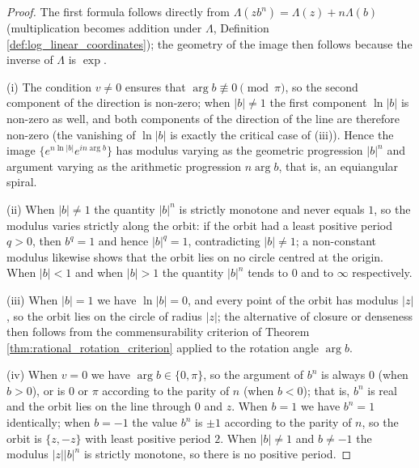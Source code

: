 \begin{proof}
The first formula follows directly from $\Lambda(zb^n)=\Lambda(z)+n\Lambda(b)$ (multiplication becomes addition under $\Lambda$, Definition \ref{def:log_linear_coordinates}); the geometry of the image then follows because the inverse of $\Lambda$ is $\exp$.

(i) The condition $v\neq0$ ensures that $\arg b\not\equiv0\pmod{\pi}$, so the second component of the direction is non-zero; when $|b|\neq1$ the first component $\ln|b|$ is non-zero as well, and both components of the direction of the line are therefore non-zero (the vanishing of $\ln|b|$ is exactly the critical case of (iii)). Hence the image $\{e^{n\ln|b|}e^{in\arg b}\}$ has modulus varying as the geometric progression $|b|^n$ and argument varying as the arithmetic progression $n\arg b$, that is, an equiangular spiral.

(ii) When $|b|\neq1$ the quantity $|b|^n$ is strictly monotone and never equals $1$, so the modulus varies strictly along the orbit: if the orbit had a least positive period $q>0$, then $b^q=1$ and hence $|b|^q=1$, contradicting $|b|\neq1$; a non-constant modulus likewise shows that the orbit lies on no circle centred at the origin. When $|b|<1$ and when $|b|>1$ the quantity $|b|^n$ tends to $0$ and to $\infty$ respectively.

(iii) When $|b|=1$ we have $\ln|b|=0$, and every point of the orbit has modulus $|z|$, so the orbit lies on the circle of radius $|z|$; the alternative of closure or denseness then follows from the commensurability criterion of Theorem \ref{thm:rational_rotation_criterion} applied to the rotation angle $\arg b$.

(iv) When $v=0$ we have $\arg b\in\{0,\pi\}$, so the argument of $b^n$ is always $0$ (when $b>0$), or is $0$ or $\pi$ according to the parity of $n$ (when $b<0$); that is, $b^n$ is real and the orbit lies on the line through $0$ and $z$. When $b=1$ we have $b^n=1$ identically; when $b=-1$ the value $b^n$ is $\pm1$ according to the parity of $n$, so the orbit is $\{z,-z\}$ with least positive period $2$. When $|b|\neq1$ and $b\neq-1$ the modulus $|z||b|^n$ is strictly monotone, so there is no positive period.
\end{proof}

